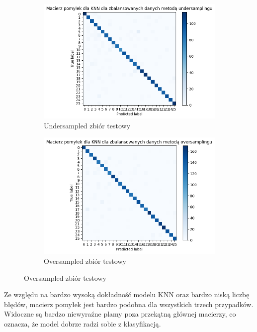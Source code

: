 \begin{figure}[H]
    \begin{subfigure}{0.5\textwidth}
        \centering
        \includegraphics[width=\textwidth]{img/confusion_under.png}
        \caption{Undersampled zbiór testowy}
        \label{fig:confusion_matrix_knn_under}
    \end{subfigure}
    \begin{subfigure}{0.49\textwidth}
        \centering
        \includegraphics[width=\textwidth]{img/confusion_over.png}
        \caption{Oversampled zbiór testowy}
        \label{fig:confusion_matrix_knn_over}
    \end{subfigure}
\end{figure}
Ze względu na bardzo wysoką dokładność modelu KNN oraz bardzo niską liczbę błędów, macierz pomyłek jest bardzo podobna dla wszystkich trzech przypadków.
Widoczne są bardzo niewyraźne plamy poza przekątną głównej macierzy, co oznacza, że model dobrze radzi sobie z klasyfikacją.
